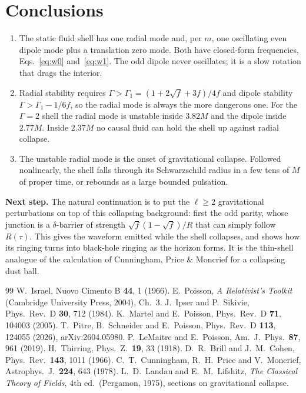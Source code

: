 \documentclass[10.5pt,a4paper]{article}
\newcommand{\sq}{\sqrt{f}}
\begin{document}
\section{Conclusions}
\begin{enumerate}
\item The static fluid shell has one radial mode and, per $m$, one oscillating even dipole mode plus a translation zero
mode. Both have closed-form frequencies, Eqs.~\eqref{eq:w0} and~\eqref{eq:w1}. The odd dipole never oscillates; it is a
slow rotation that drags the interior.
\item Radial stability requires $\Gamma>\Gamma_1=(1+2\sq+3f)/4f$ and dipole stability $\Gamma>\Gamma_1-1/6f$, so the
radial mode is always the more dangerous one. For the $\Gamma=2$ shell the radial mode is unstable inside $3.82M$ and the
dipole inside $2.77M$. Inside $2.37M$ no causal fluid can hold the shell up against radial collapse.
\item The unstable radial mode is the onset of gravitational collapse. Followed nonlinearly, the shell falls through its
Schwarzschild radius in a few tens of $M$ of proper time, or rebounds as a large bounded pulsation.
\end{enumerate}

\noindent\colorbox{idea!8}{\parbox{\dimexpr\linewidth-2\fboxsep}{\small\textbf{\color{idea}Next step.} The natural
continuation is to put the $\ell\ge2$ gravitational perturbations on top of this collapsing background: first the odd
parity, whose junction is a $\delta$-barrier of strength $\sq(1-\sq)/R$ that can simply follow $R(\tau)$. This gives the
waveform emitted while the shell collapses, and shows how its ringing turns into black-hole ringing as the horizon
forms. It is the thin-shell analogue of the calculation of Cunningham, Price \& Moncrief \cite{CPM78} for a collapsing dust
ball.}}

\vspace{2mm}
{\footnotesize
\begin{thebibliography}{99}\setlength{\itemsep}{0pt}
 W.~Israel, Nuovo Cimento B \textbf{44}, 1 (1966).
 E.~Poisson, \emph{A Relativist's Toolkit} (Cambridge University Press, 2004), Ch.~3.
 J.~Ipser and P.~Sikivie, Phys.\ Rev.\ D \textbf{30}, 712 (1984).
 K.~Martel and E.~Poisson, Phys.\ Rev.\ D \textbf{71}, 104003 (2005).
 T.~Pitre, B.~Schneider and E.~Poisson, Phys.\ Rev.\ D \textbf{113}, 124055 (2026), arXiv:2604.05980.
 P.~LeMaitre and E.~Poisson, Am.\ J.\ Phys.\ \textbf{87}, 961 (2019).
 H.~Thirring, Phys.\ Z.\ \textbf{19}, 33 (1918).
 D.~R.~Brill and J.~M.~Cohen, Phys.\ Rev.\ \textbf{143}, 1011 (1966).
 C.~T.~Cunningham, R.~H.~Price and V.~Moncrief, Astrophys.\ J.\ \textbf{224}, 643 (1978).
 L.~D.~Landau and E.~M.~Lifshitz, \emph{The Classical Theory of Fields}, 4th ed.\ (Pergamon, 1975), sections on gravitational collapse.
\end{thebibliography}}
\end{document}
